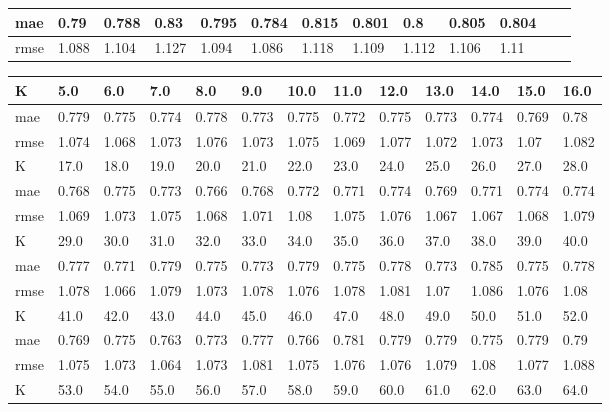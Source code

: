 \begin{appendices}
\begin{center}
\begin{tabularx}{\textwidth}{|l|X|X|X|X|X|X|X|X|X|X|X|X|}
		mae & 0.79 & 0.788 & 0.83 & 0.795 & 0.784 & 0.815 & 0.801 & 0.8 & 0.805 & 0.804 & &   \\ \hline 
		rmse & 1.088 & 1.104 & 1.127 & 1.094 & 1.086 & 1.118 & 1.109 & 1.112 & 1.106 & 1.11  & & \\ \hline 
	\end{tabularx} 
\end{center}
\begin{center} 
	\begin{tabularx}{\textwidth}{|l|X|X|X|X|X|X|X|X|X|X|X|X|} 
		\hline 
		K & 5.0 & 6.0 & 7.0 & 8.0 & 9.0 & 10.0 & 11.0 & 12.0 & 13.0 & 14.0 & 15.0 & 16.0 \\ \hline 
		mae & 0.779 & 0.775 & 0.774 & 0.778 & 0.773 & 0.775 & 0.772 & 0.775 & 0.773 & 0.774 & 0.769 & 0.78 \\ \hline 
		rmse & 1.074 & 1.068 & 1.073 & 1.076 & 1.073 & 1.075 & 1.069 & 1.077 & 1.072 & 1.073 & 1.07 & 1.082 \\ \hline 
		\hline 
		K & 17.0 & 18.0 & 19.0 & 20.0 & 21.0 & 22.0 & 23.0 & 24.0 & 25.0 & 26.0 & 27.0 & 28.0 \\ \hline 
		mae & 0.768 & 0.775 & 0.773 & 0.766 & 0.768 & 0.772 & 0.771 & 0.774 & 0.769 & 0.771 & 0.774 & 0.774 \\ \hline 
		rmse & 1.069 & 1.073 & 1.075 & 1.068 & 1.071 & 1.08 & 1.075 & 1.076 & 1.067 & 1.067 & 1.068 & 1.079 \\ \hline 
		\hline 
		K & 29.0 & 30.0 & 31.0 & 32.0 & 33.0 & 34.0 & 35.0 & 36.0 & 37.0 & 38.0 & 39.0 & 40.0 \\ \hline 
		mae & 0.777 & 0.771 & 0.779 & 0.775 & 0.773 & 0.779 & 0.775 & 0.778 & 0.773 & 0.785 & 0.775 & 0.778 \\ \hline 
		rmse & 1.078 & 1.066 & 1.079 & 1.073 & 1.078 & 1.076 & 1.078 & 1.081 & 1.07 & 1.086 & 1.076 & 1.08 \\ \hline 
		\hline 
		K & 41.0 & 42.0 & 43.0 & 44.0 & 45.0 & 46.0 & 47.0 & 48.0 & 49.0 & 50.0 & 51.0 & 52.0 \\ \hline 
		mae & 0.769 & 0.775 & 0.763 & 0.773 & 0.777 & 0.766 & 0.781 & 0.779 & 0.779 & 0.775 & 0.779 & 0.79 \\ \hline 
		rmse & 1.075 & 1.073 & 1.064 & 1.073 & 1.081 & 1.075 & 1.076 & 1.076 & 1.079 & 1.08 & 1.077 & 1.088 \\ \hline 
		\hline 
		K & 53.0 & 54.0 & 55.0 & 56.0 & 57.0 & 58.0 & 59.0 & 60.0 & 61.0 & 62.0 & 63.0 & 64.0 \\ \hline 

\end{tabularx}
\end{center}
\end{appendices}
